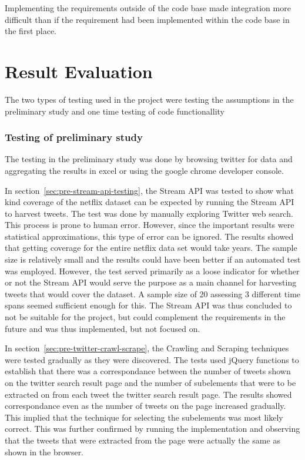 Implementing the requirements outside of the code base made integration more difficult than if the requirement had been implemented within the code base in the first place.

\section{Result Evaluation}
The two types of testing used in the project were testing the assumptions in the preliminary study and one time testing of code functionallity

\subsubsection{Testing of preliminary study}
The testing in the preliminary study was done by browsing twitter for data and aggregating the results in excel or using the google chrome developer console.

In section~\ref{sec:pre-stream-api-testing}, the Stream API was tested to show what kind coverage of the netflix dataset can be expected by running the Stream API to harvest tweets. The test was done by manually exploring Twitter web search. This process is prone to human error. However, since the important results were statistical approximations, this type of error can be ignored. The results showed that getting coverage for the entire netflix data set would take years. The sample size is relatively small and the results could have been better if an automated test was employed. However, the test served primarily as a loose indicator for whether or not the Stream API would serve the purpose as a main channel for harvesting tweets that would cover the dataset. A sample size of 20 assessing 3 different time spans seemed sufficient enough for this. The Stream API was thus concluded to not be suitable for the project, but could complement the requirements in the future and was thus implemented, but not focused on.

In section~\ref{sec:pre-twitter-crawl-scrape}, the Crawling and Scraping techniques were tested gradually as they were discovered. The tests used jQuery functions to establish that there was a correspondance between the number of tweets shown on the twitter search result page and the number of subelements that were to be extracted on from each tweet the twitter search result page. The results showed correspondance even as the number of tweets on the page increased gradually. This implied that the technique for selecting the subelements was most likely correct. This was further confirmed by running the implementation and observing that the tweets that were extracted from the page were actually the same as shown in the browser.


